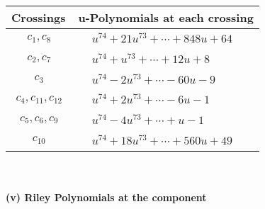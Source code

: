 \documentclass[1p]{elsarticle_modified}
\theoremstyle{definition}
\begin{document}
\begin{tabular}{m{50pt}|m{274pt}}
Crossings & \hspace{64pt}u-Polynomials at each crossing \\
\hline $$\begin{aligned}c_{1},c_{8}\end{aligned}$$&$\begin{aligned}
&u^{74}+21 u^{73}+\cdots+848 u+64
\end{aligned}$\\
\hline $$\begin{aligned}c_{2},c_{7}\end{aligned}$$&$\begin{aligned}
&u^{74}+u^{73}+\cdots+12 u+8
\end{aligned}$\\
\hline $$\begin{aligned}c_{3}\end{aligned}$$&$\begin{aligned}
&u^{74}-2 u^{73}+\cdots-60 u-9
\end{aligned}$\\
\hline $$\begin{aligned}c_{4},c_{11},c_{12}\end{aligned}$$&$\begin{aligned}
&u^{74}+2 u^{73}+\cdots-6 u-1
\end{aligned}$\\
\hline $$\begin{aligned}c_{5},c_{6},c_{9}\end{aligned}$$&$\begin{aligned}
&u^{74}-4 u^{73}+\cdots+u-1
\end{aligned}$\\
\hline $$\begin{aligned}c_{10}\end{aligned}$$&$\begin{aligned}
&u^{74}+18 u^{73}+\cdots+560 u+49
\end{aligned}$\\
\hline
\end{tabular}\\~\\
\newpage\renewcommand{\arraystretch}{1}
\flushleft \textbf{(v) Riley Polynomials at the component}\newline \\
\end{document}
